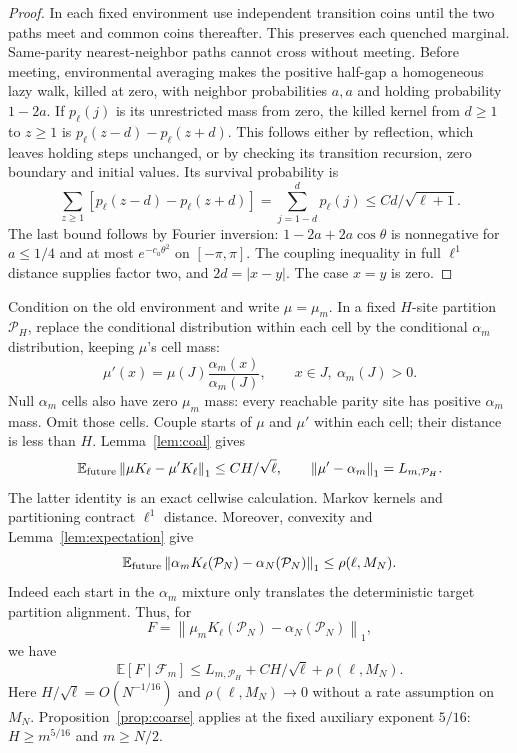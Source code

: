 \documentclass[11pt]{article}
\newcommand{\EE}{\mathbb E}
\newcommand{\cF}{\mathcal F}
\newcommand{\cP}{\mathcal P}
\newcommand{\norm}[1]{\left\lVert#1\right\rVert_1}
\begin{document}
\begin{proof}
In each fixed environment use independent transition coins until
the two paths meet and common coins thereafter. This preserves
each quenched marginal. Same-parity nearest-neighbor paths cannot
cross without meeting. Before meeting, environmental averaging
makes the positive half-gap a homogeneous lazy walk, killed at
zero, with neighbor probabilities $a,a$ and holding probability
$1-2a$. If $p_\ell(j)$ is its unrestricted mass from zero, the killed
kernel from $d\geq1$ to $z\geq1$ is
$p_\ell(z-d)-p_\ell(z+d)$. This follows either by reflection,
which leaves holding steps unchanged, or by checking its transition
recursion, zero boundary and initial values. Its survival probability is
\[
 \sum_{z\geq1}[p_\ell(z-d)-p_\ell(z+d)]
               =\sum_{j=1-d}^{d}p_\ell(j)
               \leq Cd/\sqrt{\ell+1}.
\]
The last bound follows by Fourier inversion:
$1-2a+2a\cos\theta$ is nonnegative for $a\leq1/4$ and at most
$e^{-c_a\theta^2}$ on $[-\pi,\pi]$.
The coupling inequality in full $\ell^1$ distance supplies factor
two, and $2d=|x-y|$. The case $x=y$ is zero.
\end{proof}

Condition on the old environment and write $\mu=\mu_m$.
In a fixed $H$-site partition $\cP_H$, replace the conditional
distribution within each cell by the conditional $\alpha_m$
distribution, keeping $\mu$'s cell mass:
\[
       \mu'(x)=\mu(J)\frac{\alpha_m(x)}{\alpha_m(J)},
                       \qquad x\in J,\ \alpha_m(J)>0.
\]
Null $\alpha_m$ cells also have zero $\mu_m$ mass: every reachable
parity site has positive $\alpha_m$ mass. Omit those cells.
Couple starts of $\mu$ and $\mu'$ within each cell; their distance
is less than $H$. Lemma~\ref{lem:coal} gives
\[
 \EE_{\rm future}\norm{\mu K_\ell-\mu'K_\ell}
                        \leq CH/\sqrt\ell,\qquad
 \norm{\mu'-\alpha_m}=L_{m,\cP_H}.
\]
The latter identity is an exact cellwise calculation.
Markov kernels and partitioning contract $\ell^1$ distance.
Moreover, convexity and Lemma~\ref{lem:expectation} give
\[
 \EE_{\rm future}
   \norm{\alpha_mK_\ell(\cP_N)-\alpha_N(\cP_N)}
                      \leq\rho(\ell,M_N).
\]
Indeed each start in the $\alpha_m$ mixture only translates the
deterministic target partition alignment. Thus, for
\[
       F=\norm{\mu_mK_\ell(\cP_N)-\alpha_N(\cP_N)},
\]
we have
\begin{equation}\label{eq:meantransfer}
 \EE[F\mid\cF_m]
     \leq L_{m,\cP_H}+CH/\sqrt\ell+\rho(\ell,M_N).
\end{equation}
Here $H/\sqrt\ell=O(N^{-1/16})$ and $\rho(\ell,M_N)\to0$
without a rate assumption on $M_N$.
Proposition~\ref{prop:coarse} applies at the fixed auxiliary
exponent $5/16$: $H\geq m^{5/16}$ and $m\geq N/2$.
\end{document}
